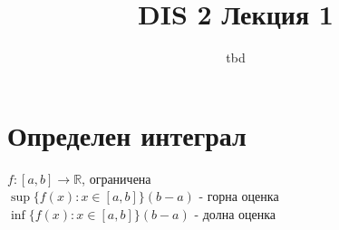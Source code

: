 \documentclass{article}
\author{tbd}
\title{DIS 2 Лекция 1}
\begin{document}
\maketitle

\section{Определен интеграл}
\begin{figure*}[h!]
    
    

    \(f:[a,b] \to \mathbb{R} \), ограничена \\
    \(\sup\{ f(x) : x \in [a, b] \} (b-a)\) - горна оценка \\
    \(\inf\{ f(x) : x \in [a, b] \} (b-a)\) - долна оценка
    
\end{figure*}
\end{document}
